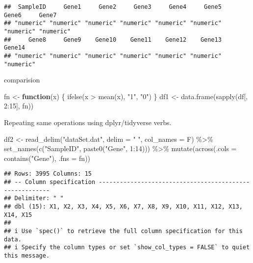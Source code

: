 \documentclass[
]{article}
\newenvironment{Shaded}{\begin{snugshade}}{\end{snugshade}}
\newcommand{\AttributeTok}[1]{\textcolor[rgb]{0.77,0.63,0.00}{#1}}
\newcommand{\ControlFlowTok}[1]{\textcolor[rgb]{0.13,0.29,0.53}{\textbf{#1}}}
\newcommand{\DecValTok}[1]{\textcolor[rgb]{0.00,0.00,0.81}{#1}}
\newcommand{\FunctionTok}[1]{\textcolor[rgb]{0.00,0.00,0.00}{#1}}
\newcommand{\NormalTok}[1]{#1}
\newcommand{\OtherTok}[1]{\textcolor[rgb]{0.56,0.35,0.01}{#1}}
\newcommand{\SpecialCharTok}[1]{\textcolor[rgb]{0.00,0.00,0.00}{#1}}
\newcommand{\StringTok}[1]{\textcolor[rgb]{0.31,0.60,0.02}{#1}}
\begin{document}
\begin{verbatim}
##  SampleID     Gene1     Gene2     Gene3     Gene4     Gene5     Gene6     Gene7 
## "numeric" "numeric" "numeric" "numeric" "numeric" "numeric" "numeric" "numeric" 
##     Gene8     Gene9    Gene10    Gene11    Gene12    Gene13    Gene14 
## "numeric" "numeric" "numeric" "numeric" "numeric" "numeric" "numeric"
\end{verbatim}

comparision

\begin{Shaded}
\begin{Highlighting}[]
\NormalTok{fn }\OtherTok{\textless{}{-}} \ControlFlowTok{function}\NormalTok{(x) \{}
    \FunctionTok{ifelse}\NormalTok{(x }\SpecialCharTok{\textgreater{}} \FunctionTok{mean}\NormalTok{(x), }\StringTok{"1"}\NormalTok{, }\StringTok{"0"}\NormalTok{)}
\NormalTok{\}}
\NormalTok{df1 }\OtherTok{\textless{}{-}} \FunctionTok{data.frame}\NormalTok{(}\FunctionTok{sapply}\NormalTok{(df[, }\DecValTok{2}\SpecialCharTok{:}\DecValTok{15}\NormalTok{], fn))}
\end{Highlighting}
\end{Shaded}

Repeating same operations using dplyr/tidyverse verbs.

\begin{Shaded}
\begin{Highlighting}[]
\NormalTok{df2 }\OtherTok{\textless{}{-}} \FunctionTok{read\_delim}\NormalTok{(}\StringTok{"dataSet.dat"}\NormalTok{, }\AttributeTok{delim =} \StringTok{" "}\NormalTok{, }\AttributeTok{col\_names =}\NormalTok{ F) }\SpecialCharTok{\%\textgreater{}\%}
    \FunctionTok{set\_names}\NormalTok{(}\FunctionTok{c}\NormalTok{(}\StringTok{"SampleID"}\NormalTok{, }\FunctionTok{paste0}\NormalTok{(}\StringTok{"Gene"}\NormalTok{, }\DecValTok{1}\SpecialCharTok{:}\DecValTok{14}\NormalTok{))) }\SpecialCharTok{\%\textgreater{}\%}
    \FunctionTok{mutate}\NormalTok{(}\FunctionTok{across}\NormalTok{(}\AttributeTok{.cols =} \FunctionTok{contains}\NormalTok{(}\StringTok{"Gene"}\NormalTok{), }\AttributeTok{.fns =}\NormalTok{ fn))}
\end{Highlighting}
\end{Shaded}

\begin{verbatim}
## Rows: 3995 Columns: 15
## -- Column specification --------------------------------------------------------
## Delimiter: " "
## dbl (15): X1, X2, X3, X4, X5, X6, X7, X8, X9, X10, X11, X12, X13, X14, X15
## 
## i Use `spec()` to retrieve the full column specification for this data.
## i Specify the column types or set `show_col_types = FALSE` to quiet this message.
\end{verbatim}
\end{document}
